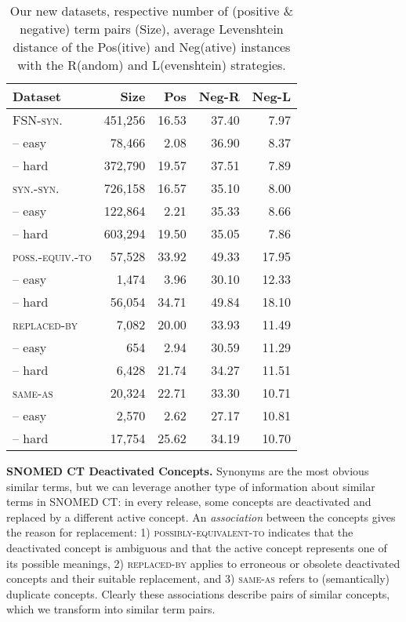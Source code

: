 \documentclass[letterpaper]{article} %
\newcommand{\dataset}[1]{\textsc{#1}}
\begin{document}
\begin{table}[th]
    \centering
    \footnotesize
    \begin{tabular}{l r r r r}
     \toprule
        \textbf{Dataset} & \textbf{Size}  & \textbf{Pos} & \textbf{Neg-R} & \textbf{Neg-L}\\
        \midrule
        \dataset{FSN-syn.} & 451,256 & 16.53 & 37.40 & 7.97\\
        -- easy & 78,466 & 2.08 & 36.90 & 8.37\\
        -- hard & 372,790 & 19.57 & 37.51 & 7.89\\
        \midrule
        \dataset{syn.-syn.} & 726,158 & 16.57 & 35.10 & 8.00 \\
        -- easy & 122,864 & 2.21 & 35.33 & 8.66\\
        -- hard & 603,294 & 19.50 & 35.05 & 7.86\\
        \midrule
        \dataset{poss.-equiv.-to} & 57,528 & 33.92 & 49.33 & 17.95\\
        -- easy & 1,474 & 3.96 & 30.10 & 12.33\\
        -- hard & 56,054 & 34.71 & 49.84 & 18.10\\
        \midrule
        \dataset{replaced-by} & 7,082 & 20.00 & 33.93 & 11.49\\
        -- easy & 654 & 2.94 & 30.59 & 11.29\\
        -- hard & 6,428 & 21.74 & 34.27 & 11.51\\
        \midrule
        \dataset{same-as} & 20,324 & 22.71 & 33.30 & 10.71\\
        -- easy & 2,570 & 2.62 & 27.17 & 10.81\\
        -- hard & 17,754 & 25.62 & 34.19 & 10.70\\
        \bottomrule
    \end{tabular}
    \caption{Our new datasets, respective number of (positive \& negative) term pairs (Size), average Levenshtein distance of the Pos(itive) and  Neg(ative) instances with the R(andom) and L(evenshtein) strategies.}
    \label{tab:datasets}
\end{table}

\noindent \textbf{SNOMED CT Deactivated Concepts.}
Synonyms are the most obvious similar terms, but
 we can leverage another type of information about similar terms in SNOMED CT: in every release, some concepts are deactivated and replaced by a different active concept. An \emph{association} between the concepts gives the reason for replacement: 1) \dataset{possibly-equivalent-to} indicates that the deactivated concept is ambiguous and that the active concept represents one of its possible meanings,
2) \dataset{replaced-by} applies to erroneous or obsolete deactivated concepts and their suitable replacement, and
3) \dataset{same-as} refers to (semantically) duplicate concepts.
Clearly these associations describe pairs of similar concepts, which we transform into similar term pairs.
\end{document}
